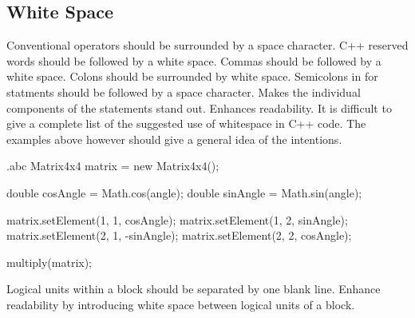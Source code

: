 \subsection{White Space}

\begin{filecontents*}{\jobname.abc}
	a = (b + c) * d; // NOT: a=(b+c)*d
	
	while (true)   // NOT: while(true) 
	{
	   //...
		
	doSomething(a, b, c, d);  // NOT: doSomething(a,b,c,d);
		
	case 100 :  // NOT: case 100:
		
	for (i = 0; i < 10; i++) {  // NOT: for(i=0;i<10;i++){
	    //...	
\end{filecontents*}

\recommendation
{
	Conventional operators should be surrounded by a space character.\newline
	C++ reserved words should be followed by a white space. \newline
	Commas should be followed by a white space. \newline
	Colons should be surrounded by white space. \newline
	Semicolons in for statments should be followed by a space character.\newline
}
{}
{Makes the individual components of the statements stand out. Enhances readability. It is difficult to give a complete list of the suggested use of whitespace in C++ code. The examples above however should give a general idea of the intentions.}


\begin{filecontents*}{\jobname.abc}
		Matrix4x4 matrix = new Matrix4x4();
		
		double cosAngle = Math.cos(angle);
		double sinAngle = Math.sin(angle);
		
		matrix.setElement(1, 1,  cosAngle);
		matrix.setElement(1, 2,  sinAngle);
		matrix.setElement(2, 1, -sinAngle);
		matrix.setElement(2, 2,  cosAngle);
		
		multiply(matrix);
\end{filecontents*}

\recommendation
{Logical units within a block should be separated by one blank line.}
{}
{Enhance readability by introducing white space between logical units of a block.}




